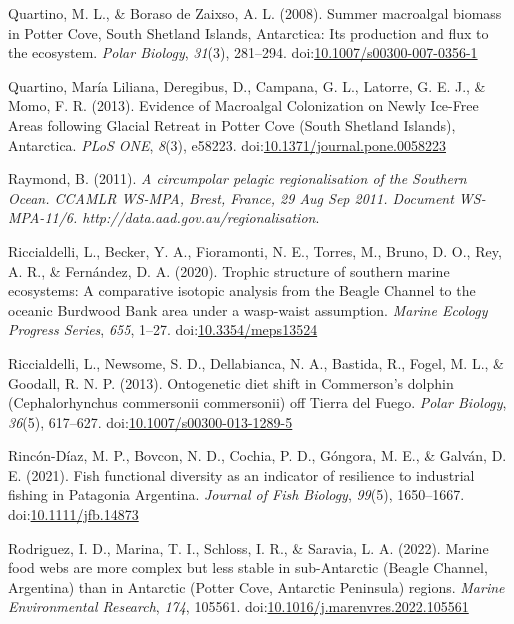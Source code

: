 \documentclass[
]{article}
\newlength{\cslhangindent}
\newlength{\cslentryspacingunit} %
\newenvironment{CSLReferences}[2] %
 {%
  \setlength{\parindent}{0pt}
  \ifodd #1
  \let\oldpar\par
  \def\par{\hangindent=\cslhangindent\oldpar}
  \fi
  \setlength{\parskip}{#2\cslentryspacingunit}
 }%
 {}
\begin{document}
\begin{CSLReferences}{1}{0}
\leavevmode{}%
Quartino, M. L., \& Boraso de Zaixso, A. L. (2008). Summer macroalgal
biomass in {Potter Cove}, {South Shetland Islands}, {Antarctica}: Its
production and flux to the ecosystem. \emph{Polar Biology},
\emph{31}(3), 281--294.
doi:\href{https://doi.org/10.1007/s00300-007-0356-1}{10.1007/s00300-007-0356-1}

\leavevmode{}%
Quartino, María Liliana, Deregibus, D., Campana, G. L., Latorre, G. E.
J., \& Momo, F. R. (2013). Evidence of {Macroalgal Colonization} on
{Newly Ice-Free Areas} following {Glacial Retreat} in {Potter Cove}
({South Shetland Islands}), {Antarctica}. \emph{PLoS ONE}, \emph{8}(3),
e58223.
doi:\href{https://doi.org/10.1371/journal.pone.0058223}{10.1371/journal.pone.0058223}

\leavevmode{}%
Raymond, B. (2011). \emph{A circumpolar pelagic regionalisation of the
{Southern Ocean}. {CCAMLR WS-MPA}, {Brest}, {France}, 29
{Aug} {Sep} 2011. {Document WS-MPA-11}/6.
{http://data.aad.gov.au/regionalisation}}.

\leavevmode{}%
Riccialdelli, L., Becker, Y. A., Fioramonti, N. E., Torres, M., Bruno,
D. O., Rey, A. R., \& Fernández, D. A. (2020). Trophic structure of
southern marine ecosystems: A comparative isotopic analysis from the
{Beagle Channel} to the oceanic {Burdwood Bank} area under a wasp-waist
assumption. \emph{Marine Ecology Progress Series}, \emph{655}, 1--27.
doi:\href{https://doi.org/10.3354/meps13524}{10.3354/meps13524}

\leavevmode{}%
Riccialdelli, L., Newsome, S. D., Dellabianca, N. A., Bastida, R.,
Fogel, M. L., \& Goodall, R. N. P. (2013). Ontogenetic diet shift in
{Commerson}'s dolphin ({Cephalorhynchus} commersonii commersonii) off
{Tierra} del {Fuego}. \emph{Polar Biology}, \emph{36}(5), 617--627.
doi:\href{https://doi.org/10.1007/s00300-013-1289-5}{10.1007/s00300-013-1289-5}

\leavevmode{}%
Rincón-Díaz, M. P., Bovcon, N. D., Cochia, P. D., Góngora, M. E., \&
Galván, D. E. (2021). Fish functional diversity as an indicator of
resilience to industrial fishing in {Patagonia Argentina}. \emph{Journal
of Fish Biology}, \emph{99}(5), 1650--1667.
doi:\href{https://doi.org/10.1111/jfb.14873}{10.1111/jfb.14873}

\leavevmode{}%
Rodriguez, I. D., Marina, T. I., Schloss, I. R., \& Saravia, L. A.
(2022). Marine food webs are more complex but less stable in
sub-{Antarctic} ({Beagle Channel}, {Argentina}) than in {Antarctic}
({Potter Cove}, {Antarctic Peninsula}) regions. \emph{Marine
Environmental Research}, \emph{174}, 105561.
doi:\href{https://doi.org/10.1016/j.marenvres.2022.105561}{10.1016/j.marenvres.2022.105561}


\end{CSLReferences}
\end{document}
